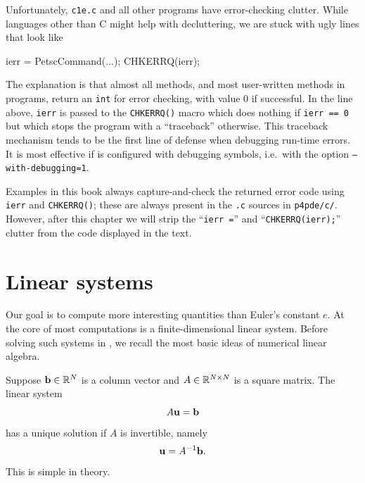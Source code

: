 Unfortunately, \texttt{c1e.c} and all other \PETSc programs have error-checking clutter.  While languages other than C might help with decluttering, we are stuck with ugly lines that look like
\begin{code}
ierr = PetscCommand(...); CHKERRQ(ierr);
\end{code}
The explanation is that almost all \PETSc methods, and most user-written methods in \PETSc programs, return an \texttt{int} for error checking, with value $0$ if successful.  In the line above, \texttt{ierr} is passed to the \texttt{CHKERRQ()} macro which does nothing if \texttt{ierr == 0} but which stops the program with a ``traceback'' otherwise.  This traceback mechanism tends to be the first line of defense when debugging run-time errors.  It is most effective if \PETSc is configured with debugging symbols, i.e.~with the option \texttt{--with-debugging=1}.

Examples in this book always capture-and-check the returned error code using \texttt{ierr} and \texttt{CHKERRQ()}; these are always present in the \texttt{.c} sources in \texttt{p4pde/c/}.  However, after this chapter we will strip the ``\texttt{ierr =}'' and ``\texttt{CHKERRQ(ierr);}'' clutter from the code displayed in the text.


\section{Linear systems}

Our goal is to compute more interesting quantities than Euler's constant $e$.  At the core of most \PETSc computations is a finite-dimensional linear system.  Before solving such systems in \PETSc, we recall the most basic ideas of numerical linear algebra.

Suppose $\mathbf{b}\in \mathbb{R}^{N}$ is a column vector and $A\in\mathbb{R}^{N\times N}$ is a square matrix.  The linear system
\begin{equation}
A \mathbf{u} = \mathbf{b} \label{introsystem}
\end{equation}
has a unique solution if $A$ is invertible, namely
\begin{equation}
\mathbf{u} = A^{-1} \mathbf{b}. \label{introsolution}
\end{equation}
This is simple in theory.

